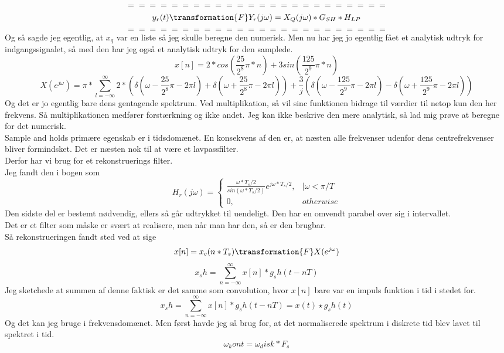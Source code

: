 \begin{Opgaver}
\begin{kapitel}
\begin{Opgave}
\begin{UnderOpgave}
                \[========================\]
                \[y_r(t) \transformation{F} Y_r(j\omega) = X_Q(j\omega)*G_{SH} * H_{LP}\] 
                \[========================\]
                Og så sagde jeg egentlig, at $x_q$ var en liste så jeg skulle beregne den numerisk. Men nu har jeg jo egentlig fået et analytisk udtryk for indgangssignalet, 
                så med den har jeg også et analytisk udtryk for den samplede. 
                \[x[n] = 2*cos(\frac{25}{2^8}\pi*n) + 3sin(\frac{125}{2^9}\pi*n)\]
                \[X(e^{j\omega}) = \pi * \sum_{l = -\infty}^{\infty}{2 * (\delta(\omega - \frac{25}{2^8}\pi - 2\pi l) + \delta(\omega + \frac{25}{2^8}\pi - 2\pi l)) + \frac{3}{j}(\delta(\omega - \frac{125}{2^9}\pi - 2\pi l) - \delta(\omega + \frac{125}{2^9}\pi - 2\pi l))}\]
                Og det er jo egentlig bare dens gentagende spektrum. 
                Ved multiplikation, så vil sinc funktionen bidrage til værdier til netop kun den her frekvens. 
                Så multiplikationen medfører forstærkning og ikke andet. 
                Jeg kan ikke beskrive den mere analytisk, så lad mig prøve at beregne for det numerisk.
                \\
                Sample and holds primære egenskab er i tidsdomænet. En konsekvens af den er, at næsten alle frekvenser udenfor dens centrefrekvenser bliver formindsket. 
                Det er næsten nok til at være et lavpassfilter.\\
                Derfor har vi brug for et rekonstruerings filter. \\ 
                Jeg fandt den i bogen som 
                \[H_r(j\omega) = 
                    \begin{cases}
                        \frac{\omega * T_s/2}{sin(\omega * T_s/2)}e^{j\omega*T_s/2}, & |\omega < \pi/T \\
                        0, & otherwise
                    \end{cases}\]
                Den sidste del er bestemt nødvendig, ellers så går udtrykket til uendeligt. Den har en omvendt parabel over sig i intervallet. \\
                Det er et filter som måske er svært at realisere, men når man har den, så er den brugbar. \\
                                

                Så rekonstrueringen fandt sted ved at sige
                \[x[n] = x_c(n*T_s) \transformation{F} X(e^{j\omega})\]
                \[x_sh = \sum_{n=-\infty}^{\infty}{x[n]*g_sh(t - nT)}\]
                Jeg sketchede at summen af denne faktisk er det samme som convolution, hvor $x[n]$ bare var en impuls funktion i tid i stedet for.  
                \[x_sh = \sum_{n=-\infty}^{\infty}{x[n]*g_sh(t - nT)} = x(t)\star g_sh(t)\]
                Og det kan jeg bruge i frekvensdomænet. Men først havde jeg så brug for, at det normaliserede spektrum i diskrete tid blev lavet til spektret i tid. 
                \[\omega_kont = \omega_disk * F_s\]


\end{UnderOpgave}
\end{Opgave}
\end{kapitel}
\end{Opgaver}
